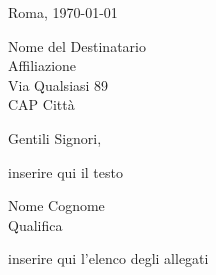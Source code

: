 \documentclass[12pt]{article}
\begin{document}
\sf %
\parskip=5pt %

\noindent
\begin{minipage}[t]{5cm}
Roma, \today
\end{minipage}

\hfill
\begin{minipage}[t]{6cm}
Nome del Destinatario\\
Affiliazione\\
Via Qualsiasi 89\\
CAP Citt\`a
\end{minipage}

\vskip 1.5cm


\vskip 1cm

\noindent
Gentili Signori,

inserire qui il testo \vskip 1cm

\hfill
\begin{minipage}{6cm}
Nome Cognome\\
Qualifica
\end{minipage}

\vfill {}

inserire qui l'elenco degli allegati
\end{document}
